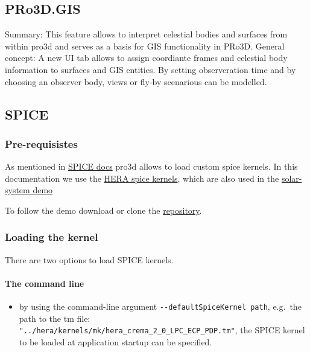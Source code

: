 \hypertarget{pro3d.gis}{%
\subsection{PRo3D.GIS}\label{pro3d.gis}}

Summary: This feature allows to interpret celestial bodies and surfaces
from within pro3d and serves as a basis for GIS functionality in PRo3D.
General concept: A new UI tab allows to assign coordiante frames and
celestial body information to surfaces and GIS entities. By setting
observeration time and by choosing an observer body, views or fly-by
scenarious can be modelled.

\hypertarget{spice}{%
\subsection{SPICE}\label{spice}}

\hypertarget{pre-requisistes}{%
\subsubsection{Pre-requisistes}\label{pre-requisistes}}

As mentioned in \href{./spice.md}{SPICE docs} pro3d allows to load
custom spice kernels. In this documentation we use the
\href{https://s2e2.cosmos.esa.int/bitbucket/projects/spice_kernels/repos/hera/browse}{HERA
spice kernels}, which are also used in the
\href{https://github.com/pro3d-space/PRo3D.SPICE}{solar-system demo}

To follow the demo download or clone the
\href{https://s2e2.cosmos.esa.int/bitbucket/projects/spice_kernels/repos/hera/browse}{repository}.

\hypertarget{loading-the-kernel}{%
\subsubsection{Loading the kernel}\label{loading-the-kernel}}

There are two options to load SPICE kernels.

\hypertarget{the-command-line}{%
\paragraph{The command line}\label{the-command-line}}

\begin{itemize}
\tightlist
\item
  by using the command-line argument
  \texttt{-\/-defaultSpiceKernel\ path}, e.g.~the path to the tm file:
  \texttt{"../hera/kernels/mk/hera\_crema\_2\_0\_LPC\_ECP\_PDP.tm"}, the
  SPICE kernel to be loaded at application startup can be specified.
\end{itemize}

